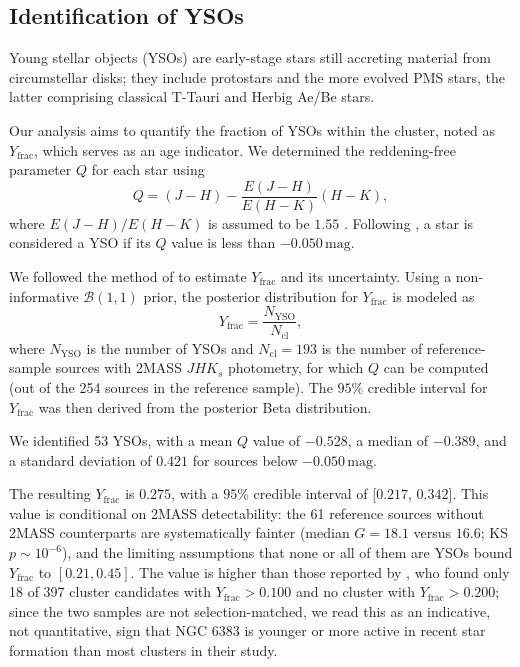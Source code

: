\documentclass{aa}
\begin{document}
\subsection{Identification of YSOs}

Young stellar objects (YSOs) are early-stage stars still accreting material from circumstellar disks; they include protostars and the more evolved PMS stars, the latter comprising classical T-Tauri and Herbig Ae/Be stars.

Our analysis aims to quantify the fraction of YSOs within the cluster, noted as $ Y_{\text{frac}} $, which serves as an age indicator. We determined the reddening-free parameter $ Q $ for each star using
\begin{equation}
	Q = (J - H) - \frac{E(J-H)}{E(H - K)} (H-K),
\end{equation}
where $ E(J-H)/E(H-K) $ is assumed to be $1.55$ \citep{1990ARA&A..28...37M}. Following \citet{2013MNRAS.436.1465B}, a star is considered a YSO if its $ Q $ value is less than $-0.050\,\mathrm{mag}$.

We followed the method of \citet{2011PASA...28..128C} to estimate $ Y_{\text{frac}} $ and its uncertainty. Using a non-informative $\mathcal{B}(1, 1)$ prior, the posterior distribution for $ Y_{\text{frac}} $ is modeled as
\begin{equation}
	Y_{\text{frac}} = \frac{N_{\text{YSO}}}{N_{\text{cl}}},
\end{equation}
where $ N_{\text{YSO}} $ is the number of YSOs and $ N_{\text{cl}}=193 $ is the number of reference-sample sources with 2MASS $JHK_s$ photometry, for which $Q$ can be computed (out of the 254 sources in the reference sample). The $95\%$ credible interval for $ Y_{\text{frac}} $ was then derived from the posterior Beta distribution.

We identified 53 YSOs, with a mean $ Q $ value of $-0.528$, a median of $-0.389$, and a standard deviation of $0.421$ for sources below $-0.050\,\mathrm{mag}$.

The resulting $ Y_{\text{frac}} $ is $0.275$, with a $95\%$ credible interval of [$0.217$, $0.342$]. This value is conditional on 2MASS detectability: the 61 reference sources without 2MASS counterparts are systematically fainter (median $G=18.1$ versus $16.6$; KS $p\sim10^{-6}$), and the limiting assumptions that none or all of them are YSOs bound $Y_{\text{frac}}$ to $[0.21, 0.45]$. The value is higher than those reported by \citet{2013MNRAS.436.1465B}, who found only 18 of 397 cluster candidates with $ Y_{\text{frac}} > 0.100 $ and no cluster with $ Y_{\text{frac}} > 0.200 $; since the two samples are not selection-matched, we read this as an indicative, not quantitative, sign that NGC 6383 is younger or more active in recent star formation than most clusters in their study.
\end{document}
